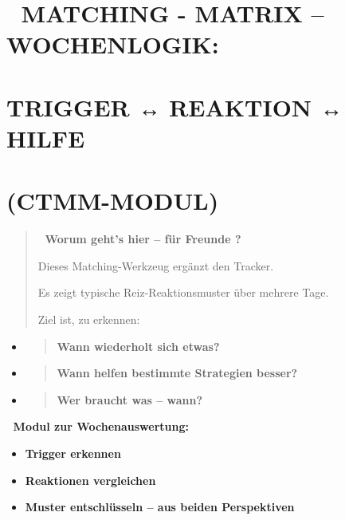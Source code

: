 %


\hypertarget{matching---matrix-wochenlogik}{%
\section{\texorpdfstring{🧩 \textbf{MATCHING - MATRIX -- WOCHENLOGIK:}}{🧩 MATCHING - MATRIX -- WOCHENLOGIK:}}\label{matching---matrix-wochenlogik}}

\hypertarget{trigger-reaktion-hilfe}{%
\section{\texorpdfstring{\textbf{TRIGGER ↔ REAKTION ↔ HILFE}}{TRIGGER ↔ REAKTION ↔ HILFE}}\label{trigger-reaktion-hilfe}}

\hypertarget{ctmm-modul}{%
\section{\texorpdfstring{\textbf{(CTMM-MODUL)}}{(CTMM-MODUL)}}\label{ctmm-modul}}

\begin{quote}
🧠 \textbf{Worum geht's hier -- für Freunde ?}

Dieses Matching-Werkzeug ergänzt den Tracker.

Es zeigt typische Reiz-Reaktionsmuster über mehrere Tage.

Ziel ist, zu erkennen:
\end{quote}

\begin{itemize}
\item
  \begin{quote}
  \textbf{Wann wiederholt sich etwas?}
  \end{quote}
\item
  \begin{quote}
  \textbf{Wann helfen bestimmte Strategien besser?}
  \end{quote}
\item
  \begin{quote}
  \textbf{Wer braucht was -- wann?}
  \end{quote}
\end{itemize}

🧩 \textbf{Modul zur Wochenauswertung:}

\begin{itemize}
\item
  \textbf{Trigger erkennen}
\item
  \textbf{Reaktionen vergleichen}
\item
  \textbf{Muster entschlüsseln -- aus beiden Perspektiven}
\end{itemize}


